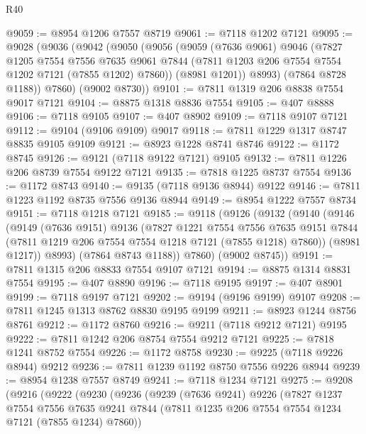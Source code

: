 \begin{lexlean}{R40}
\begin{coremodule}
@9059 := @8954 @1206 @7557 @8719
@9061 := @7118 @1202 @7121
@9095 := @9028
    (@9036
      (@9042
        (@9050
          (@9056
            (@9059
              (@7636 @9061)
              @9046
              (@7827
                @1205
                @7554
                @7556
                @7635
                @9061
                @7844
                (@7811 @1203 @206 @7554 @7554 @1202 @7121 (@7855 @1202) @7860))
              (@8981 @1201))
            @8993)
          (@7864 @8728 @1188))
        @7860)
      (@9002 @8730))
@9101 := @7811 @1319 @206 @8838 @7554 @9017 @7121
@9104 := @8875 @1318 @8836 @7554
@9105 := @407 @8888
@9106 := @7118 @9105
@9107 := @407 @8902
@9109 := @7118 @9107 @7121
@9112 := @9104 (@9106 @9109) @9017
@9118 := @7811 @1229 @1317 @8747 @8835 @9105 @9109
@9121 := @8923 @1228 @8741 @8746
@9122 := @1172 @8745
@9126 := @9121 (@7118 @9122 @7121) @9105
@9132 := @7811 @1226 @206 @8739 @7554 @9122 @7121
@9135 := @7818 @1225 @8737 @7554
@9136 := @1172 @8743
@9140 := @9135 (@7118 @9136 @8944) @9122
@9146 := @7811 @1223 @1192 @8735 @7556 @9136 @8944
@9149 := @8954 @1222 @7557 @8734
@9151 := @7118 @1218 @7121
@9185 := @9118
    (@9126
      (@9132
        (@9140
          (@9146
            (@9149
              (@7636 @9151)
              @9136
              (@7827
                @1221
                @7554
                @7556
                @7635
                @9151
                @7844
                (@7811 @1219 @206 @7554 @7554 @1218 @7121 (@7855 @1218) @7860))
              (@8981 @1217))
            @8993)
          (@7864 @8743 @1188))
        @7860)
      (@9002 @8745))
@9191 := @7811 @1315 @206 @8833 @7554 @9107 @7121
@9194 := @8875 @1314 @8831 @7554
@9195 := @407 @8890
@9196 := @7118 @9195
@9197 := @407 @8901
@9199 := @7118 @9197 @7121
@9202 := @9194 (@9196 @9199) @9107
@9208 := @7811 @1245 @1313 @8762 @8830 @9195 @9199
@9211 := @8923 @1244 @8756 @8761
@9212 := @1172 @8760
@9216 := @9211 (@7118 @9212 @7121) @9195
@9222 := @7811 @1242 @206 @8754 @7554 @9212 @7121
@9225 := @7818 @1241 @8752 @7554
@9226 := @1172 @8758
@9230 := @9225 (@7118 @9226 @8944) @9212
@9236 := @7811 @1239 @1192 @8750 @7556 @9226 @8944
@9239 := @8954 @1238 @7557 @8749
@9241 := @7118 @1234 @7121
@9275 := @9208
    (@9216
      (@9222
        (@9230
          (@9236
            (@9239
              (@7636 @9241)
              @9226
              (@7827
                @1237
                @7554
                @7556
                @7635
                @9241
                @7844
                (@7811 @1235 @206 @7554 @7554 @1234 @7121 (@7855 @1234) @7860))

\end{coremodule}
\end{lexlean}
